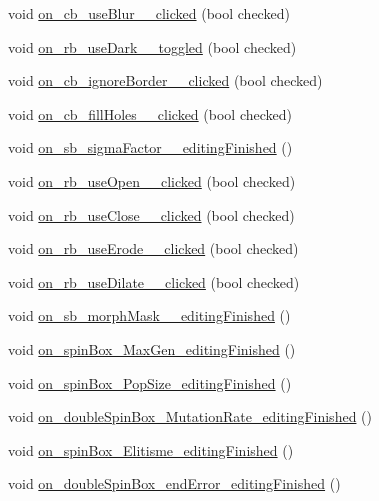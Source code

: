 \begin{DoxyCompactItemize}
void \hyperlink{class_dialog_settings_a71f71044299e80f1c520e529fd67df43}{on\+\_\+cb\+\_\+use\+Blur\+\_\+\_\+clicked} (bool checked)
\item 
void \hyperlink{class_dialog_settings_af1577c6b225da64f565ad23528e538bf}{on\+\_\+rb\+\_\+use\+Dark\+\_\+\_\+toggled} (bool checked)
\item 
void \hyperlink{class_dialog_settings_a2f1a496fde19c1728e0cc9eec30c304d}{on\+\_\+cb\+\_\+ignore\+Border\+\_\+\_\+clicked} (bool checked)
\item 
void \hyperlink{class_dialog_settings_a020f004b906e659d4ba2920281112afa}{on\+\_\+cb\+\_\+fill\+Holes\+\_\+\_\+clicked} (bool checked)
\item 
void \hyperlink{class_dialog_settings_a1a907ca905e313fe606b84b80829f80b}{on\+\_\+sb\+\_\+sigma\+Factor\+\_\+\_\+editing\+Finished} ()
\item 
void \hyperlink{class_dialog_settings_af9143e7adfb0e07b94d6c3dcfd851178}{on\+\_\+rb\+\_\+use\+Open\+\_\+\_\+clicked} (bool checked)
\item 
void \hyperlink{class_dialog_settings_a30b98652c0e2e76bedf94194eba32212}{on\+\_\+rb\+\_\+use\+Close\+\_\+\_\+clicked} (bool checked)
\item 
void \hyperlink{class_dialog_settings_ac26a73f5f28eadc10b77fd7fe58a5a43}{on\+\_\+rb\+\_\+use\+Erode\+\_\+\_\+clicked} (bool checked)
\item 
void \hyperlink{class_dialog_settings_a02cf8145814a1a2d012001ecb95febfd}{on\+\_\+rb\+\_\+use\+Dilate\+\_\+\_\+clicked} (bool checked)
\item 
void \hyperlink{class_dialog_settings_a23694b9ccf8039028fd2ab6be697a1a3}{on\+\_\+sb\+\_\+morph\+Mask\+\_\+\_\+editing\+Finished} ()
\item 
void \hyperlink{class_dialog_settings_ac243e39cfe6dea2e101e92916bd96a07}{on\+\_\+spin\+Box\+\_\+\+Max\+Gen\+\_\+editing\+Finished} ()
\item 
void \hyperlink{class_dialog_settings_a86f5de4b60bc75e7328bb4103b0b17bf}{on\+\_\+spin\+Box\+\_\+\+Pop\+Size\+\_\+editing\+Finished} ()
\item 
void \hyperlink{class_dialog_settings_aca1680d915f5237c05259cb6f5a8da59}{on\+\_\+double\+Spin\+Box\+\_\+\+Mutation\+Rate\+\_\+editing\+Finished} ()
\item 
void \hyperlink{class_dialog_settings_aef0a13201f0159b7f4972b1048caf46e}{on\+\_\+spin\+Box\+\_\+\+Elitisme\+\_\+editing\+Finished} ()
\item 
void \hyperlink{class_dialog_settings_ac8c3a2a0b37eef330f59240d6d88aa31}{on\+\_\+double\+Spin\+Box\+\_\+end\+Error\+\_\+editing\+Finished} ()

\end{DoxyCompactItemize}
